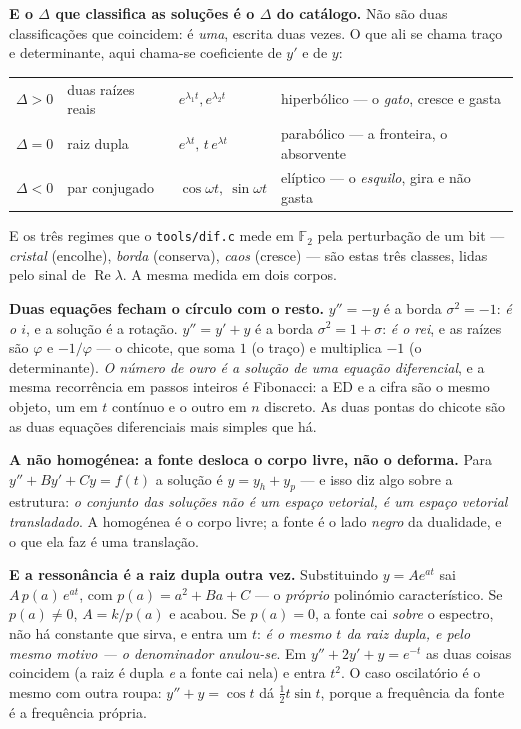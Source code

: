 \documentclass[11pt]{article}
\newcommand{\code}[1]{\texttt{\small #1}}
\newcommand{\F}{\mathbb F}
\theoremstyle{plain}
\theoremstyle{remark}
\begin{document}
\begin{itemize}
\textbf{E o $\Delta$ que classifica as soluções é o $\Delta$ do catálogo.} Não são duas
classificações que coincidem: é \emph{uma}, escrita duas vezes. O que ali se chama traço e
determinante, aqui chama-se coeficiente de $y'$ e de $y$:
\begin{center}
\begin{tabular}{llll}
$\Delta>0$ & duas raízes reais & $e^{\lambda_1t},e^{\lambda_2t}$ & hiperbólico --- o \emph{gato}, cresce e gasta \\
$\Delta=0$ & raiz dupla & $e^{\lambda t},\,t\,e^{\lambda t}$ & parabólico --- a fronteira, o absorvente \\
$\Delta<0$ & par conjugado & $\cos\omega t,\ \sin\omega t$ & elíptico --- o \emph{esquilo}, gira e não gasta \\
\end{tabular}
\end{center}
E os três regimes que o \code{tools/dif.c} mede em $\F_2$ pela perturbação de um bit ---
\emph{cristal} (encolhe), \emph{borda} (conserva), \emph{caos} (cresce) --- são estas três
classes, lidas pelo sinal de $\operatorname{Re}\lambda$. A mesma medida em dois corpos.

\textbf{Duas equações fecham o círculo com o resto.} $y''=-y$ é a borda $\sigma^2=-1$: \emph{é o
$i$}, e a solução é a rotação. $y''=y'+y$ é a borda $\sigma^2=1+\sigma$: \emph{é o rei}, e as
raízes são $\varphi$ e $-1/\varphi$ --- o chicote, que soma $1$ (o traço) e multiplica $-1$ (o
determinante). \emph{O número de ouro é a solução de uma equação diferencial}, e a mesma
recorrência em passos inteiros é Fibonacci: a ED e a cifra são o mesmo objeto, um em $t$ contínuo
e o outro em $n$ discreto. As duas pontas do chicote são as duas equações diferenciais mais
simples que há.

\textbf{A não homogénea: a fonte desloca o corpo livre, não o deforma.} Para
$y''+By'+Cy=f(t)$ a solução é $y=y_h+y_p$ --- e isso diz algo sobre a estrutura: \emph{o conjunto
das soluções não é um espaço vetorial, é um espaço vetorial transladado}. A homogénea é o corpo
livre; a fonte é o lado \emph{negro} da dualidade, e o que ela faz é uma translação.

\textbf{E a ressonância é a raiz dupla outra vez.} Substituindo $y=Ae^{at}$ sai $A\,p(a)\,e^{at}$,
com $p(a)=a^2+Ba+C$ --- o \emph{próprio} polinómio característico. Se $p(a)\neq0$, $A=k/p(a)$ e
acabou. Se $p(a)=0$, a fonte cai \emph{sobre} o espectro, não há constante que sirva, e entra um
$t$: \emph{é o mesmo $t$ da raiz dupla, e pelo mesmo motivo --- o denominador anulou-se}. Em
$y''+2y'+y=e^{-t}$ as duas coisas coincidem (a raiz é dupla \emph{e} a fonte cai nela) e entra
$t^2$. O caso oscilatório é o mesmo com outra roupa: $y''+y=\cos t$ dá $\tfrac12 t\sin t$, porque a
frequência da fonte é a frequência própria.


\end{itemize}
\end{document}
